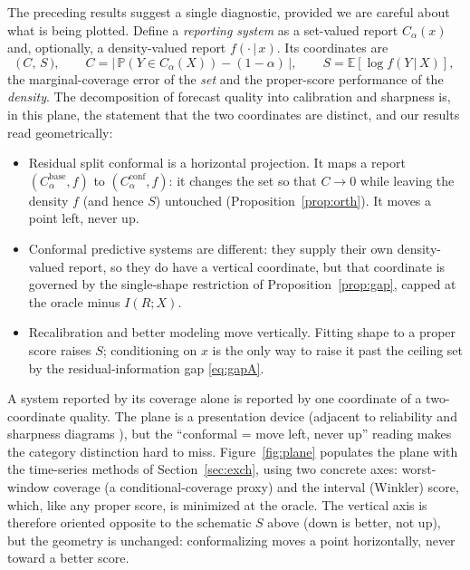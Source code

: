 \documentclass[11pt]{article}
\theoremstyle{definition}
\newcommand{\E}{\mathbb{E}}
\renewcommand{\Pr}{\mathbb{P}}
\newcommand{\given}{\,\vert\,}
\begin{document}
The preceding results suggest a single diagnostic, provided we are careful about what is
being plotted. Define a \emph{reporting system} as a set-valued report $C_\alpha(x)$ and,
optionally, a density-valued report $f(\cdot\given x)$. Its coordinates are
\begin{equation}
  \big(\,C,\,S\,\big),\qquad
  C=\big|\,\Pr(Y\in C_\alpha(X))-(1-\alpha)\,\big|,\qquad
  S=\E[\log f(Y\given X)],
\end{equation}
the marginal-coverage error of the \emph{set} and the proper-score performance of the
\emph{density}. The decomposition of forecast quality into calibration and sharpness
\citep{gneiting2007probabilistic} is, in this plane, the statement that the two
coordinates are distinct, and our results read geometrically:
\begin{itemize}
  \item Residual split conformal is a horizontal projection. It maps a report
  $(C_\alpha^{\text{base}},f)$ to $(C_\alpha^{\text{conf}},f)$: it changes the set so that
  $C\to 0$ while leaving the density $f$ (and hence $S$) untouched
  (Proposition~\ref{prop:orth}). It moves a point left, never up.
  \item Conformal predictive systems are different: they supply their own
  density-valued report, so they do have a vertical coordinate, but that coordinate is
  governed by the single-shape restriction of Proposition~\ref{prop:gap}, capped at the
  oracle minus $I(R;X)$.
  \item Recalibration and better modeling move vertically. Fitting shape to a
  proper score raises $S$; conditioning on $x$ is the only way to raise it past the
  ceiling set by the residual-information gap \eqref{eq:gapA}.
\end{itemize}
A system reported by its coverage alone is reported by one coordinate of a
two-coordinate quality. The plane is a presentation device (adjacent to reliability
and sharpness diagrams \citep{gneiting2007probabilistic}), but the ``conformal = move
left, never up'' reading makes the category distinction hard to miss. Figure~\ref{fig:plane}
populates the plane with the time-series methods of Section~\ref{sec:exch}, using two
concrete axes: worst-window coverage (a conditional-coverage proxy) and the interval
(Winkler) score, which, like any proper score, is minimized at the oracle. The vertical axis
is therefore oriented opposite to the schematic $S$ above (down is better, not up), but the
geometry is unchanged: conformalizing moves a point horizontally, never toward a better
score.
\end{document}
